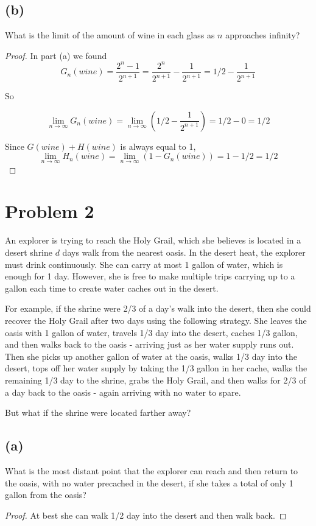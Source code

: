 \documentclass[14pt]{extarticle}
\newcommand{\dps}{\displaystyle}
\begin{document}
\subsection{(b)}
What is the limit of the amount of wine in each glass as $n$ approaches infinity?
\begin{proof}
In part (a) we found
$$
G_n(wine) = \dps \frac{2^n - 1}{2^{n+1}} = \frac{2^n}{2^{n+1}} - \frac{1}{2^{n+1}} = 1/2 - \frac{1}{2^{n+1}}
$$

So

$$
\dps \lim_{n \to \infty} G_n(wine) = \lim_{n \to \infty} (1/2 - \frac{1}{2^{n+1}}) = 1/2 - 0 = 1/2
$$

Since $G(wine) + H(wine)$ is always equal to 1, 
$$
\dps\lim_{n \to \infty} H_n(wine) = \lim_{n \to \infty} (1- G_n(wine)) = 1 - 1/2 = 1/2
$$
\end{proof}

\section{Problem 2}
An explorer is trying to reach the Holy Grail, which she believes is located in a desert shrine $d$ days walk from the nearest oasis. In the desert heat, the explorer must drink continuously. She can carry at most 1 gallon of water, which is enough for 1 day. However, she is free to make multiple trips carrying up to a gallon each time to create water caches out in the desert.

For example, if the shrine were 2/3 of a day’s walk into the desert, then she could recover the Holy Grail after two days using the following strategy. She leaves the oasis with 1 gallon of water, travels 1/3 day into the desert, caches 1/3 gallon, and then walks back to the oasis - arriving just as her water supply runs out. Then she picks up another gallon of water at the oasis, walks 1/3 day into the desert, tops off her water supply by taking the 1/3 gallon in her cache, walks the remaining 1/3 day to the shrine, grabs the Holy Grail, and then walks for 2/3 of a day back to the oasis - again arriving with no water to spare.

But what if the shrine were located farther away?

\subsection{(a)}
What is the most distant point that the explorer can reach and then return to the oasis, with no water precached in the desert, if she takes a total of only 1 gallon from the oasis?
\begin{proof}
At best she can walk 1/2 day into the desert and then walk back.
\end{proof}
\end{document}
